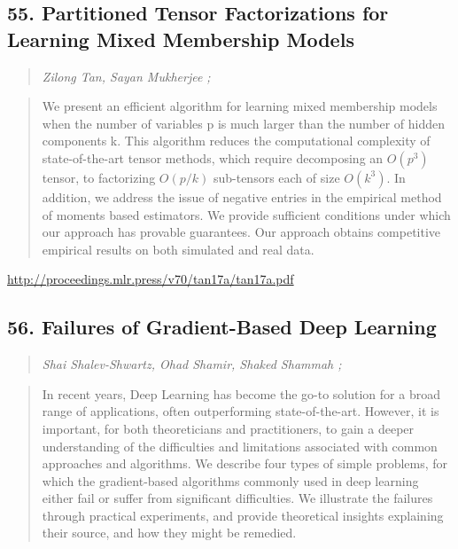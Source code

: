 \documentclass{article}
\begin{document}
\subsection{55. Partitioned Tensor Factorizations for Learning Mixed Membership Models}

\begin{quote}
\footnotesize{\textit{Zilong Tan, Sayan Mukherjee ;}}
\end{quote}

\begin{quote}
    We present an efficient algorithm for learning mixed membership models when the number of variables p is much larger than the number of hidden components k. This algorithm reduces the computational complexity of state-of-the-art tensor methods, which require decomposing an $O(p^3)$ tensor, to factorizing $O(p/k)$ sub-tensors each of size $O(k^3)$. In addition, we address the issue of negative entries in the empirical method of moments based estimators. We provide sufficient conditions under which our approach has provable guarantees. Our approach obtains competitive empirical results on both simulated and real data.  \end{quote}

\href{http://proceedings.mlr.press/v70/tan17a/tan17a.pdf}{http://proceedings.mlr.press/v70/tan17a/tan17a.pdf}

\subsection{56. Failures of Gradient-Based Deep Learning}

\begin{quote}
\footnotesize{\textit{Shai Shalev-Shwartz, Ohad Shamir, Shaked Shammah ;}}
\end{quote}

\begin{quote}
    In recent years, Deep Learning has become the go-to solution for a broad range of applications, often outperforming state-of-the-art. However, it is important, for both theoreticians and practitioners, to gain a deeper understanding of the difficulties and limitations associated with common approaches and algorithms. We describe four types of simple problems, for which the gradient-based algorithms commonly used in deep learning either fail or suffer from significant difficulties. We illustrate the failures through practical experiments, and provide theoretical insights explaining their source, and how they might be remedied.  \end{quote}
\end{document}
